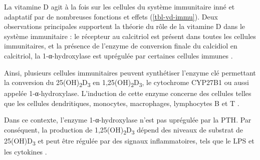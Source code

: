 \documentclass[
  a4paper,
  DIV=11,
  numbers=noendperiod,
  listof=totoc]{scrreprt}
\begin{document}
La vitamine D agit à la fois sur les cellules du système immunitaire
inné et adaptatif par de nombreuses fonctions et effets
(\cref{tbl-vd-immu}). Deux observations principales supportent la
théorie du rôle de la vitamine D dans le système immunitaire : le
récepteur au calcitriol est présent dans toutes les cellules
immunitaires, et la présence de l'enzyme de conversion finale du
calcidiol en calcitriol, la 1-α-hydroxylase est uprégulée par certaines
cellules immunes \autocite{Giannini.2022}.

Ainsi, plusieurs cellules immunitaires peuvent synthétiser l'enzyme clé
permettant la conversion du 25(OH)\textsubscript{2}D\textsubscript{3} en
1,25(OH)\textsubscript{2}D\textsubscript{3}, le cytochrome CYP27B1 ou
aussi appelée 1-α-hydroxylase. L'induction de cette enzyme concerne des
cellules telles que les cellules dendritiques, monocytes, macrophages,
lymphocytes B et T \autocites[ ]{Giannini.2022}{Dankers.2017}.

Dans ce contexte, l'enzyme 1-α-hydroxylase n'est pas uprégulée par la
\ac{PTH}. Par conséquent, la production de
1,25(OH)\textsubscript{2}D\textsubscript{3} dépend des niveaux de
substrat de 25(OH)D\textsubscript{3} et peut être régulée par des
signaux inflammatoires, tels que le \ac{LPS} et les cytokines
\autocite{Giannini.2022}.
\end{document}
